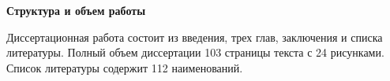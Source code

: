 
\filbreak
\textbf{Структура и объем работы}

Диссертационная работа состоит из введения, трех глав, заключения и списка литературы. Полный объем диссертации 103 страницы текста с 24 рисунками. Список литературы содержит 112 наименований.